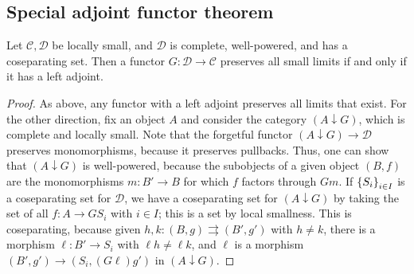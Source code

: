 \subsection{Special adjoint functor theorem}
\begin{theorem}
    Let \( \mathcal C, \mathcal D \) be locally small, and \( \mathcal D \) is complete, well-powered, and has a coseparating set.
    Then a functor \( G : \mathcal D \to \mathcal C \) preserves all small limits if and only if it has a left adjoint.
\end{theorem}
\begin{proof}
    As above, any functor with a left adjoint preserves all limits that exist.
    For the other direction, fix an object \( A \) and consider the category \( (A \downarrow G) \), which is complete and locally small.
    Note that the forgetful functor \( (A \downarrow G) \to \mathcal D \) preserves monomorphisms, because it preserves pullbacks.
    Thus, one can show that \( (A \downarrow G) \) is well-powered, because the subobjects of a given object \( (B, f) \) are the monomorphisms \( m : B' \to B \) for which \( f \) factors through \( Gm \).
    If \( \qty{S_i}_{i \in I} \) is a coseparating set for \( \mathcal D \), we have a coseparating set for \( (A \downarrow G) \) by taking the set of all \( f : A \to GS_i \) with \( i \in I \); this is a set by local smallness.
    This is coseparating, because given \( h, k : (B, g) \rightrightarrows (B', g') \) with \( h \neq k \), there is a morphism \( \ell : B' \to S_i \) with \( \ell h \neq \ell k \), and \( \ell \) is a morphism \( (B', g') \to (S_i, (G\ell)g') \) in \( (A \downarrow G) \).
\end{proof}
